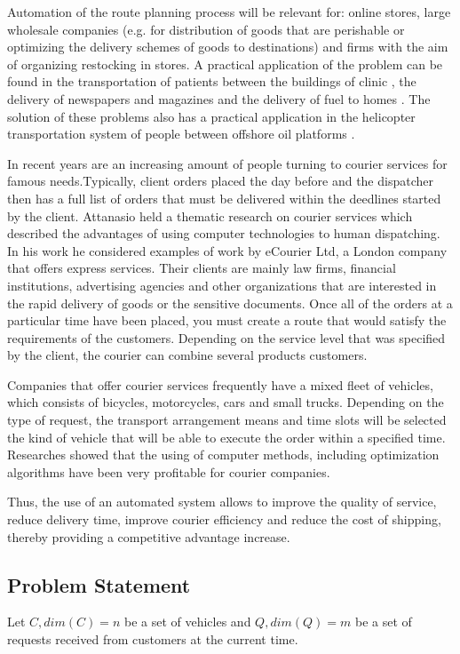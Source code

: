 \documentclass[]{TAACpaper}
\begin{document}
Automation of the route planning process will be relevant for: online stores, large wholesale companies (e.g. for distribution of goods that are perishable or optimizing the delivery schemes of goods to destinations) and firms with the aim of organizing restocking in stores. A practical application of the problem can be found in the transportation of patients between the buildings of clinic \cite{Beaudry, Kergosien}, the delivery of newspapers and magazines and the delivery of fuel to homes \cite{Sarak}. The solution of these problems also has a practical application in the helicopter transportation system of people between offshore oil platforms \cite{Romero}.

In recent years are an increasing amount of people turning to courier services for famous needs.Typically, client orders placed the day before and the dispatcher then has a full list of orders that must be delivered within the deedlines started by the client. Attanasio \cite{Attanasio} held a thematic research on courier services which described the advantages of using computer technologies to human dispatching. In his work he considered examples of work by eCourier Ltd, a London company that offers express services. Their clients are mainly law firms, financial institutions, advertising agencies and other organizations that are interested in the rapid delivery of goods or the sensitive documents. Once all of the orders at a particular time have been placed, you must create a route that would satisfy the requirements of the customers. Depending on the service level that was specified by the client, the courier can combine several products customers.

Companies that offer courier services frequently have a mixed fleet of vehicles, which consists of bicycles, motorcycles, cars and small trucks. Depending on the type of request, the transport arrangement means and time slots will be selected the kind of vehicle that will be able to execute the order within a specified time. Researches \cite{Attanasio} showed that the using of computer methods, including optimization algorithms have been very profitable for courier companies.

Thus, the use of an automated system allows to improve the quality of service, reduce delivery time, improve courier efficiency and reduce the cost of shipping, thereby providing a competitive advantage increase.

\subsection{Problem Statement}
Let $C,dim(C)=n$ be a set of vehicles and $Q,dim(Q)=m$ be a set of requests received from customers at the current time.
\end{document}
